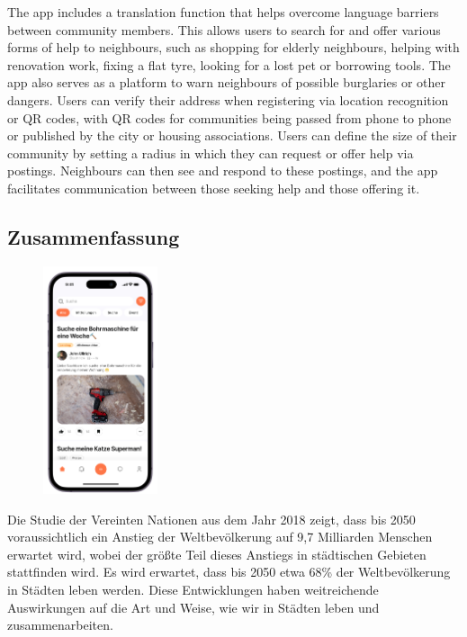 The app includes a translation function that helps overcome language barriers between community members. This allows users to search for and offer various forms of help to neighbours, such as shopping for elderly neighbours, helping with renovation work, fixing a flat tyre, looking for a lost pet or borrowing tools. The app also serves as a platform to warn neighbours of possible burglaries or other dangers. Users can verify their address when registering via location recognition or QR codes, with QR codes for communities being passed from phone to phone or published by the city or housing associations. Users can define the size of their community by setting a radius in which they can request or offer help via postings. Neighbours can then see and respond to these postings, and the app facilitates communication between those seeking help and those offering it.
\newpage
\begin{spacing}{1}
  \chapter*{Zusammenfassung}
\end{spacing}
\begin{figure}
  \begin{center}
    \includegraphics[width=0.3\textwidth]{pics/iphone.png}
  \end{center}
\end{figure}
Die Studie der Vereinten Nationen \cite{un2018world} aus dem Jahr 2018 zeigt, dass bis 2050 voraussichtlich ein Anstieg der Weltbevölkerung auf 9,7 Milliarden Menschen erwartet wird, wobei der größte Teil dieses Anstiegs in städtischen Gebieten stattfinden wird. Es wird erwartet, dass bis 2050 etwa 68\% der Weltbevölkerung in Städten leben werden. Diese Entwicklungen haben weitreichende Auswirkungen auf die Art und Weise, wie wir in Städten leben und zusammenarbeiten.

